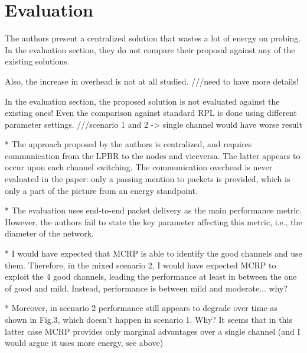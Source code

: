 \section{Evaluation}
\label{sec:evaluation}

The authors present a centralized solution that wastes a lot of energy on probing. In the evaluation section, they do not compare their proposal against any of the existing solutions.

Also, the increase in overhead is not at all studied. ///need to have more details!

In the evaluation section, the proposed solution is not evaluated against the existing ones! Even the comparison against standard RPL is done using different parameter settings. ///scenario 1 and 2 -> single channel would have worse result

* The approach proposed by the authors is centralized, and requires
  communication from the LPBR to the nodes and viceversa. The latter appears
  to occur upon each channel switching. The communication overhead is never
  evaluated in the paper: only a passing mention to packets is provided, which
  is only a part of the picture from an energy standpoint.
  
* The evaluation uses end-to-end packet delivery as the main performance
  metric. However, the authors fail to state the key parameter affecting this
  metric, i.e., the diameter of the network. 

* I would have expected that MCRP is able to identify the good channels and
  use them. Therefore, in the mixed scenario 2, I would have expected MCRP to
  exploit the 4 good channels, leading the performance at least in between the
  one of good and mild. Instead, performance is between mild and
  moderate... why?

* Moreover, in scenario 2 performance still appears to degrade over time as
  shown in Fig.3, which doesn't happen in scenario 1. Why? It seems that in
  this latter case MCRP provides only marginal advantages over a single
  channel (and I would argue it uses more energy, see above)